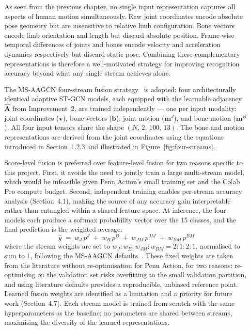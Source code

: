 As seen from the previous chapter, no single input representation captures all aspects of human motion simultaneously. Raw joint coordinates encode absolute pose geometry but are insensitive to relative limb configuration. Bone vectors encode limb orientation and length but discard absolute position. Frame-wise temporal differences of joints and bones encode velocity and acceleration dynamics respectively but discard static pose. Combining these complementary representations is therefore a well-motivated strategy for improving recognition accuracy beyond what any single stream achieves alone.

The MS-AAGCN four-stream fusion strategy~\cite{shi2020skeleton} is adopted: four architecturally identical adaptive ST-GCN models, each equipped with the learnable adjacency $\hat{\mathbf{A}}$ from Improvement~2, are trained independently --- one per input modality: joint coordinates ($\mathbf{v}$), bone vectors ($\mathbf{b}$), joint-motion ($\mathbf{m}^J$), and bone-motion ($\mathbf{m}^B$). All four input tensors share the shape $(N,\,2,\,100,\,13)$. The bone and motion representations are derived from the joint coordinates using the equations introduced in Section~1.2.3 and illustrated in Figure~\ref{fig:four-streams}.

Score-level fusion is preferred over feature-level fusion for two reasons specific to this project. First, it avoids the need to jointly train a large multi-stream model, which would be infeasible given Penn Action's small training set and the Colab Pro compute budget. Second, independent training enables per-stream accuracy analysis (Section~4.1), making the source of any accuracy gain interpretable rather than entangled within a shared feature space. At inference, the four models each produce a softmax probability vector over the 15 classes, and the final prediction is the weighted average:
%
\begin{equation}
    \hat{y} \;=\; w_J\,p^{J} \;+\; w_B\,p^{B} \;+\; w_{JM}\,p^{JM} \;+\; w_{BM}\,p^{BM}
    \label{eq:fusion}
\end{equation}
%
where the stream weights are set to $w_J : w_B : w_{JM} : w_{BM} = 2:1:2:1$, normalised to sum to 1, following the MS-AAGCN defaults~\cite{shi2020skeleton}. These fixed weights are taken from the literature without re-optimisation for Penn Action, for two reasons: re-optimising on the validation set risks overfitting to the small validation partition, and using literature defaults provides a reproducible, unbiased reference point. Learned fusion weights are identified as a limitation and a priority for future work (Section~4.7). Each stream model is trained from scratch with the same hyperparameters as the baseline; no parameters are shared between streams, maximising the diversity of the learned representations.

